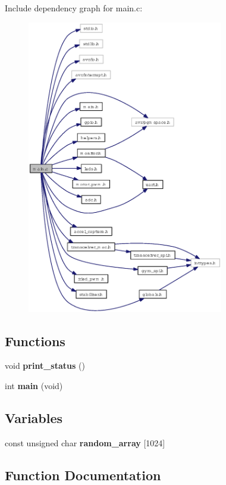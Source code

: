 Include dependency graph for main.c:\begin{figure}[H]
\begin{center}
\leavevmode
\includegraphics[width=243pt]{main_8c__incl}
\end{center}
\end{figure}
\subsection*{Functions}
\begin{CompactItemize}
\item 
void {\bf print\_\-status} ()
\item 
int {\bf main} (void)
\end{CompactItemize}
\subsection*{Variables}
\begin{CompactItemize}
\item 
const unsigned char {\bf random\_\-array} [1024]
\end{CompactItemize}


\subsection{Function Documentation}
